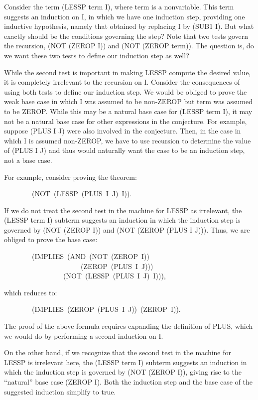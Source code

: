 \documentclass[11pt]{book}
\newenvironment{pubasis}{\begin{flushleft}\ttfamily\small}{\normalsize\rmfamily\end{flushleft}}
\begin{document}
Consider the term (LESSP term I), where term is a nonvariable.
This term suggests an induction on I, in which we have one induction
step, providing one inductive hypothesis, namely that obtained
by replacing I by (SUB1 I).  But what exactly should be the conditions
governing the step?  Note that two tests govern the recursion,
(NOT (ZEROP I)) and (NOT (ZEROP term)).  The question is, do we
want these two tests to define our induction step as well?

While the second test is important in making LESSP compute the
desired value, it is completely irrelevant to the recursion on I.
Consider the consequences of using both tests to define our induction
step.  We would be obliged to prove the weak base case in which I was
assumed to be non-ZEROP but term was assumed to be ZEROP.  While this
may be a natural base case for (LESSP term I), it may not be a
natural base case for other expressions in the conjecture.  For example,
suppose (PLUS I J) were also involved in the conjecture.  Then, in the case
in which I is assumed non-ZEROP, we have to use recursion to determine the
value of (PLUS I J) and thus would naturally want the case
to be an induction step, not a base case.

For example, consider proving the theorem:
\begin{pubasis}
~~~~~~~~(NOT~(LESSP~(PLUS~I~J)~I)).\\
\end{pubasis}
If we do not treat the second test in the machine for LESSP as
irrelevant, the (LESSP term I) subterm suggests an induction in which
the induction step is governed by (NOT (ZEROP I)) and (NOT (ZEROP (PLUS I J))).
Thus, we are obliged to prove the base case:
\begin{pubasis}
~~~~~~~~(IMPLIES~(AND~(NOT~(ZEROP~I))\\
~~~~~~~~~~~~~~~~~~~~~~(ZEROP~(PLUS~I~J)))\\
~~~~~~~~~~~~~~~~~(NOT~(LESSP~(PLUS~I~J)~I))),\\
\end{pubasis}
which reduces to:
\begin{pubasis}
~~~~~~~~(IMPLIES~(ZEROP~(PLUS~I~J))~(ZEROP~I)).\\
\end{pubasis}
The proof of the above formula requires expanding the definition of
PLUS, which we would do by performing a second induction on I.

On the other hand, if we recognize that the second test in the machine
for LESSP is irrelevant here, the (LESSP term I) subterm suggests
an induction in which the induction step is governed by (NOT (ZEROP I)),
giving rise to the ``natural'' base case (ZEROP I).  Both the induction
step and the base case of the suggested induction simplify to true.
\end{document}
